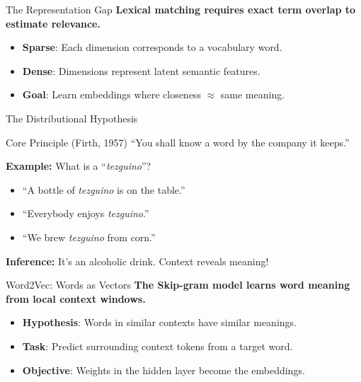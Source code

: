 \documentclass[aspectratio=169]{beamer}
\newif\ifanimated
\newcommand{\cpause}{\ifanimated\pause\fi}
\begin{document}
\begin{frame}{The Representation Gap}
\textbf{Lexical matching requires exact term overlap to estimate relevance.}

\vspace{0.8em}
\begin{itemize}
    \item \textbf{Sparse}: Each dimension corresponds to a vocabulary word.
    \item \textbf{Dense}: Dimensions represent latent semantic features.
    \item \textbf{Goal}: Learn embeddings where closeness $\approx$ same meaning.
\end{itemize}\cpause

\vspace{0.5em}
\begin{center}

\end{center}
\end{frame}

\begin{frame}{The Distributional Hypothesis}
\begin{block}{Core Principle (Firth, 1957)}
``You shall know a word by the company it keeps.''
\end{block}

\vspace{1em}\cpause
\textbf{Example:} What is a ``\textit{tezguino}''?
\begin{itemize}
    \item ``A bottle of \textit{tezguino} is on the table.''
    \item ``Everybody enjoys \textit{tezguino}.''
    \item ``We brew \textit{tezguino} from corn.''
\end{itemize}

\cpause
\vspace{0.5em}
\textbf{Inference:} It's an alcoholic drink. Context reveals meaning!
\end{frame}

\begin{frame}{Word2Vec: Words as Vectors}
\textbf{The Skip-gram model learns word meaning from local context windows.}

\vspace{0.8em}
\begin{itemize}
    \item \textbf{Hypothesis}: Words in similar contexts have similar meanings.
    \item \textbf{Task}: Predict surrounding context tokens from a target word.
    \item \textbf{Objective}: Weights in the hidden layer become the embeddings.
\end{itemize}\cpause

\vspace{0.5em}
\begin{center}

\end{center}
\end{frame}
\end{document}
